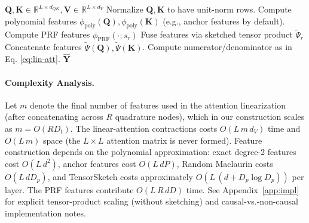\documentclass{article}
\DeclareRobustCommand{\E}{\text{\normalfont\tifinaghfont ⵟ}}
\newcommand{\R}{\mathbb{R}}
\begin{document}
\begin{algorithm}[t]
\caption{\E-Attention Forward Pass}
\begin{algorithmic}[1]
\REQUIRE $\mathbf{Q},\mathbf{K}\in\R^{L\times d_{QK}}, \mathbf{V} \in \mathbb{R}^{L \times d_{V}}$
\STATE Normalize $\mathbf{Q},\mathbf{K}$ to have unit-norm rows.
\STATE Compute polynomial features $\phi_{\text{poly}}(\mathbf{Q}),\phi_{\text{poly}}(\mathbf{K})$ (e.g., anchor features by default).
\STATE Compute PRF features $\phi_{\text{PRF}}(\cdot; s_r)$
\STATE Fuse features via sketched tensor product $\widetilde{\Psi}_r$
\ENDFOR
\STATE Concatenate features $\widetilde{\Psi}(\mathbf{Q}),\widetilde{\Psi}(\mathbf{K})$.
\STATE Compute numerator/denominator as in Eq. \ref{eq:lin-att}.
\RETURN $\widehat{\mathbf{Y}}$
\end{algorithmic}
\end{algorithm}
\paragraph{Complexity Analysis.}
Let $m$ denote the final number of features used in the attention linearization (after concatenating across $R$ quadrature nodes), which in our construction scales as $m=O(RD_t)$. The linear-attention contractions costs $O(L\,m\,d_{V})$ time and $O(L\,m)$ space (the $L\times L$ attention matrix is never formed).
Feature construction depends on the polynomial approximation: exact degree-2 features cost $O(L\,d^2)$, anchor features cost $O(L\,dP)$, Random Maclaurin costs $O(L\,dD_p)$, and TensorSketch costs approximately $O(L\,(d + D_p\log D_p))$ per layer.
The PRF features contribute $O(L\,R\,dD)$ time.
See Appendix~\ref{app:impl} for explicit tensor-product scaling (without sketching) and causal-vs.-non-causal implementation notes.
\vspace{-3mm}
\end{document}

